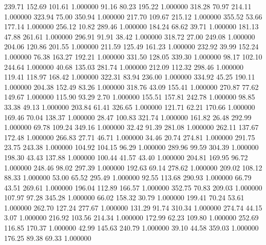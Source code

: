     239.71    152.69    101.61  1.000000
     91.16     80.23    195.22  1.000000
    318.28     70.97    214.11  1.000000
    323.94     75.00    350.94  1.000000
    217.70    109.67    215.12  1.000000
    355.52     53.66    177.14  1.000000
    256.12     10.82    289.46  1.000000
    184.24     68.62     39.71  1.000000
    181.13     47.88    261.61  1.000000
    296.91     91.91     38.42  1.000000
    318.72     27.00    249.08  1.000000
    204.06    120.86    201.55  1.000000
    211.59    125.49    161.23  1.000000
    232.92     39.99    152.24  1.000000
     76.38    163.27    192.21  1.000000
    331.50    128.05    339.30  1.000000
     98.17    102.10    244.64  1.000000
     40.68    135.03    281.74  1.000000
    212.09    112.32    298.46  1.000000
    119.41    118.97    168.42  1.000000
    322.31     83.94    236.00  1.000000
    334.92     45.25    190.11  1.000000
    204.38    152.49     83.26  1.000000
    318.76     43.09    155.41  1.000000
    270.87     77.62    149.67  1.000000
    115.90     93.29      2.70  1.000000
    155.51    157.81    242.78  1.000000
     98.85     33.38     49.13  1.000000
    203.84     61.41    326.65  1.000000
    121.71     62.21    170.66  1.000000
    169.46     70.04    138.37  1.000000
     28.47    100.83    321.74  1.000000
    161.82     26.48    292.99  1.000000
     69.78    109.24    349.16  1.000000
     32.42     91.39    281.08  1.000000
    262.11    137.67    172.48  1.000000
    266.83     27.71     46.71  1.000000
     34.46     20.74    274.81  1.000000
    291.75     23.75    243.38  1.000000
    104.92    104.15     96.29  1.000000
    289.96     99.59    304.39  1.000000
    198.30     43.43    137.88  1.000000
    100.44     41.57     43.40  1.000000
    204.81    169.95     96.72  1.000000
    248.46     98.02    297.39  1.000000
    192.63     69.14    278.62  1.000000
    209.02    108.12     88.33  1.000000
     53.00     65.52    295.49  1.000000
     92.55    113.68    290.93  1.000000
     66.79     43.51    269.61  1.000000
    196.04    112.89    166.57  1.000000
    352.75     70.83    209.03  1.000000
    107.97     97.28    345.28  1.000000
     66.02    158.32     30.79  1.000000
    199.41     70.24     53.61  1.000000
    262.70    127.24    277.67  1.000000
    131.29     91.74    310.34  1.000000
    274.74     44.15      3.07  1.000000
    216.92    103.56    214.34  1.000000
    172.99     62.23    109.80  1.000000
    252.69    116.85    170.37  1.000000
     42.99    145.63    240.79  1.000000
     39.10     44.58    359.03  1.000000
    176.25     89.38     69.33  1.000000
